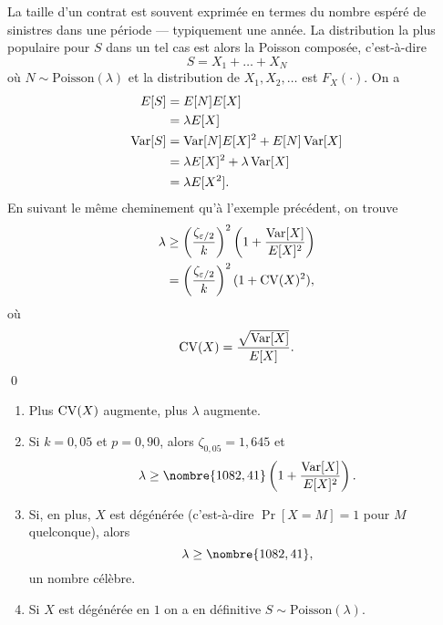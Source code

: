 \begin{exemple}
  La taille d'un contrat est souvent exprimée en termes du nombre
  espéré de sinistres dans une période --- typiquement une année. La
  distribution la plus populaire pour $S$ dans un tel cas est alors la
  Poisson composée, c'est-à-dire
  \begin{displaymath}
    S = X_1 + \dots + X_N
  \end{displaymath}
  où $N \sim \text{Poisson}(\lambda)$ et la distribution de $X_1, X_2,
  \dots$ est $F_X(\cdot)$. On a
  \begin{align*}
    E [ S ]
    &= E [ N ] E [ X ] \\
    &= \lambda E [ X ] \\
    \operatorname{Var} [ S ]
    &= \operatorname{Var} [ N ] E [ X ]^2 + E [ N ] \operatorname{Var} [ X ] \\
    &= \lambda E [ X ]^2 + \lambda \operatorname{Var} [ X ] \\
    &= \lambda E [ X^2 ].
  \end{align*}
  En suivant le même cheminement qu'à l'exemple précédent, on trouve
  \begin{align*}
    \lambda
    &\geq
    \left(
      \frac{\zeta_{\varepsilon/2}}{k}
    \right)^2
    \left(
      1 + \frac{\operatorname{Var} [ X ]}{E [ X ]^2}
    \right) \\
    &=
    \left(
      \frac{\zeta_{\varepsilon/2}}{k}
    \right)^2
    (1 + \operatorname{CV}(X)^2),
  \end{align*}
  où
  \begin{displaymath}
    \operatorname{CV}(X) = \frac{\sqrt{\operatorname{Var} [ X ]}}{E [ X ]}.
  \end{displaymath}
  \qed
\end{exemple}

\begin{rems}
  \begin{enumerate}
  \item Plus $\operatorname{CV}(X)$ augmente, plus $\lambda$ augmente.
  \item Si $k = 0,05$ et $p = 0,90$, alors $\zeta_{0,05} = 1,645$ et
    \begin{displaymath}
      \lambda
      \geq
      \nombre{1082,41}
      \left(
        1 + \frac{\var{X}}{\esp{X}^2}
      \right).
    \end{displaymath}
  \item Si, en plus, $X$ est dégénérée (c'est-à-dire $\Pr[X = M] = 1$
    pour $M$ quelconque), alors
    \begin{displaymath}
      \lambda \geq \nombre{1082,41},
    \end{displaymath}
    un nombre célèbre.
  \item Si $X$ est dégénérée en $1$ on a en définitive $S \sim
    \text{Poisson}(\lambda)$.
  \end{enumerate}
\end{rems}

